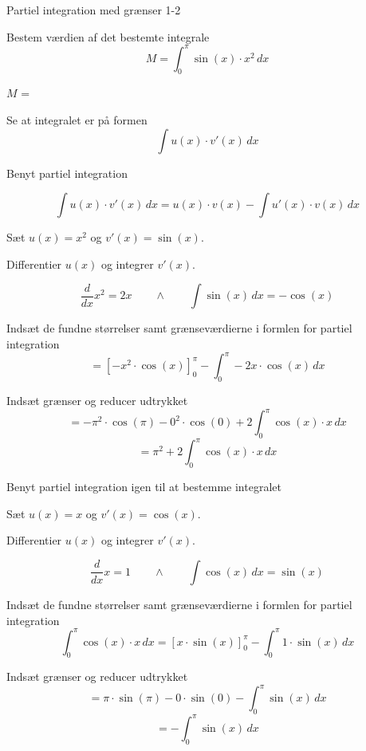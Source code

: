 \documentclass{article}
\begin{document}
\begin{exercise}{Partiel integration med grænser 1-2}
	
	
	Bestem værdien af det bestemte integrale
	\[
	M = \int_0^\pi \sin(x) \cdot x^2 \, dx
	\]
	
	$M$ =  
	
	
	\hint
	
	Se at integralet er på formen
	\[
	\int u(x) \cdot v'(x) \, dx
	\]
	
	\hint
	
	Benyt partiel integration
	
	\hint
	\[
	\int u(x) \cdot v'(x)\, dx = u(x) \cdot v(x) - \int u'(x) \cdot v(x) \, dx
	\]
	
	\hint
	
	Sæt $u(x) = x^2$ og $v'(x) = \sin(x)$.
	
	
	\hint
	
	Differentier $u(x)$ og integrer $v'(x)$.
	
	\hint
	\[
	\frac{d}{dx}x^2 = 2x \qquad \wedge \qquad \int \sin(x) \, dx = -\cos(x)
	\]
	
	\hint
	
	Indsæt de fundne størrelser samt grænseværdierne i formlen for partiel integration 
	\[
	= \left[-x^2 \cdot \cos(x) \right]_{0}^{\pi} - \int_{0}^{\pi} -2x \cdot \cos(x)  \, dx
	\]
	
	\hint
	
	Indsæt grænser og reducer udtrykket
	\[
	= -\pi^2 \cdot \cos(\pi) - 0^2 \cdot \cos(0)   + 2 \int_{0}^{\pi} \cos(x) \cdot x  \, dx
	\]
	\[
	= \pi^2 + 2  \int_{0}^{\pi} \cos(x) \cdot x  \, dx
	\]
	
	\hint 
	Benyt partiel integration igen til at bestemme integralet

	
	\hint
	
	Sæt $u(x) = x$ og $v'(x) = \cos(x)$.
	
	
	\hint
	
	Differentier $u(x)$ og integrer $v'(x)$.
	
	\hint
	\[
	\frac{d}{dx}x = 1 \qquad \wedge \qquad \int \cos(x) \, dx = \sin(x)
	\]
	
	\hint
	
	Indsæt de fundne størrelser samt grænseværdierne i formlen for partiel integration 
	\[
	\int_{0}^{\pi} \cos(x) \cdot x  \, dx = \left[ x \cdot \sin(x) \right]_0^\pi - \int_0^\pi 1 \cdot \sin(x) \, dx
	\]
	
	\hint 
	
	Indsæt grænser og reducer udtrykket
	\[
	= \pi \cdot \sin(\pi) - 0 \cdot \sin(0) - \int_0^\pi \sin(x) \,dx
	\]
	\[
	= - \int_0^\pi \sin(x) \, dx
	\]
	

\end{exercise}
\end{document}
